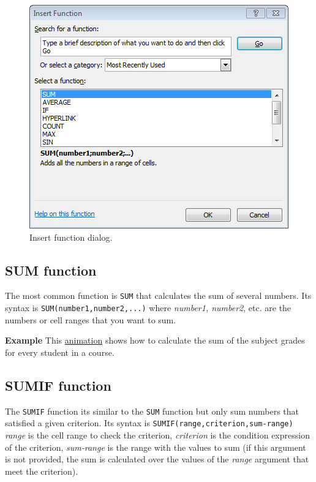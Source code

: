 \begin{figure}[htbp]
\begin{center}
\includegraphics[scale=0.7]{../img/dialog_insert_function.png}
\end{center}
\caption{Insert function dialog.}
\label{img-dialog_insert_function}
\end{figure}

\subsection{SUM function}\hypertarget{sum-function}{}\label{sum-function}

The most common function is \texttt{SUM} that calculates the sum of several numbers. Its syntax is
\texttt{SUM(number1,number2,...)} where \emph{number1, number2}, etc. are the numbers or cell ranges that you want to
sum.

\textbf{Example} This \href{http://aprendeconalf.es/office/excel/manual/img/example_function_sum.gif}{animation} shows how to calculate the sum of the subject grades for every student in a course.

\subsection{SUMIF function}\hypertarget{sumif-function}{}\label{sumif-function}

The \texttt{SUMIF} function its similar to the \texttt{SUM} function but only sum numbers that satisfied a given
criterion.
Its syntax is \texttt{SUMIF(range,criterion,sum-range)} \emph{range} is the cell range to check the criterion,
\emph{criterion} is the condition expression of the criterion, \emph{sum-range} is the range with the values to sum (if
this argument is not provided, the sum is calculated over the values of the \emph{range} argument that meet the
criterion).


